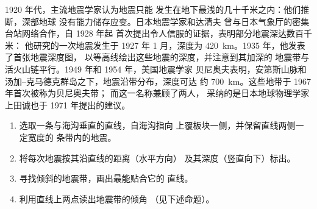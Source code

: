 \begin{history}[和达与贝尼奥夫]
1920 年代，主流地震学家认为地震只能
发生在地下最浅的几十千米之内：他们推断，深部地球
没有能力储存应变。日本地震学家和达清夫
曾与日本气象厅的密集台站网络合作，自 1928 年起
首次提出令人信服的证据，表明部分地震深达数百千米：
他研究的一次地震发生于 1927 年 1 月，深度为
\qty{420}{km}。1935 年，他发表了首张地震深度图，
以等高线绘出这些地震的深度，并注意到其加深的
地震带与活火山链平行。1949 年和 1954 年，美国地震学家
贝尼奥夫表明，安第斯山脉和
汤加–克马德克群岛之下，地震沿带分布，深度可达
约 \qty{700}{km}。这些地带于 1967 年首次被称为贝尼奥夫带；
而这一名称兼顾了两人，
采纳的是日本地球物理学家上田诚也于 1971 年提出的建议。
\end{history}

\begin{method}[读取地震剖面]\label{met:g11:subduction-zones:section}
\begin{enumerate}
  \item 选取一条与海沟垂直的直线，自海沟指向
        上覆板块一侧，并保留直线两侧一定宽度的
        条带内的地震。
  \item 将每次地震按其沿直线的距离（水平方向）
        及其深度（竖直向下）标出。
  \item 寻找倾斜的地震带，画出最能贴合它的
        直线。
  \item 利用直线上两点读出地震带的倾角
        （见下述命题）。
\end{enumerate}
\end{method}

